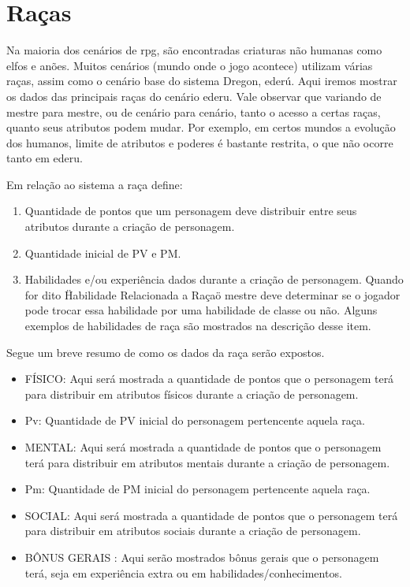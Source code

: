
\chapter{Raças}
\label{Cap:racas}

Na maioria dos cenários de rpg, são encontradas criaturas não humanas como elfos e anões. Muitos cenários (mundo onde o jogo acontece) utilizam várias raças, assim como o cenário base do sistema Dregon, ederú. Aqui iremos mostrar os dados das principais raças do cenário ederu. Vale observar que variando de mestre para mestre, ou de cenário para cenário, tanto o acesso a certas raças, quanto seus atributos podem mudar. Por exemplo, em certos mundos a evolução dos humanos, limite de atributos e poderes é bastante restrita, o que não ocorre tanto em ederu.

Em relação ao sistema a raça define:
\begin{enumerate}
	\item Quantidade de pontos que um personagem deve distribuir entre seus atributos durante a criação de personagem. 
	\item Quantidade inicial de PV e PM.
	\item Habilidades e/ou experiência dados durante a criação de personagem. Quando for dito \"Habilidade Relacionada a Raça\" o mestre deve determinar se o jogador pode trocar essa habilidade por uma habilidade de classe ou não. Alguns exemplos de habilidades de raça são mostrados na descrição desse item.
\end{enumerate}


Segue um breve resumo de como os dados da raça serão expostos.

\begin{itemize}

	\item FÍSICO: Aqui será mostrada a quantidade de pontos que o personagem terá para distribuir em atributos físicos durante a criação de personagem.

	\item Pv: Quantidade de PV inicial do personagem pertencente aquela raça.

	\item MENTAL: Aqui será mostrada a quantidade de pontos que o personagem terá para distribuir em atributos mentais durante a criação de personagem.
	\item Pm: Quantidade de PM inicial do personagem pertencente aquela raça.


	\item SOCIAL: Aqui será mostrada a quantidade de pontos que o personagem terá para distribuir em atributos sociais durante a criação de personagem.


	\item BÔNUS GERAIS : Aqui serão mostrados bônus gerais que o personagem terá, seja em experiência extra ou em habilidades/conhecimentos.
\end{itemize}

